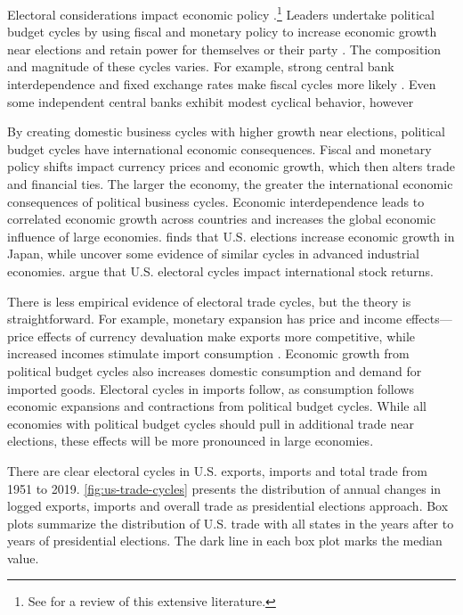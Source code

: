 \documentclass[12pt]{article}
\begin{document}
Electoral considerations impact economic policy \citep{Nordhaus1975}.\footnote{See \citet{Dubois2016} for a review of this extensive literature.} 
Leaders undertake political budget cycles by using fiscal and monetary policy to increase economic growth near elections and retain power for themselves or their party \citep{Tufte1978, Rogoff1987}. 
The composition and magnitude of these cycles varies. 
For example, strong central bank interdependence and fixed exchange rates make fiscal cycles more likely \citep{ClarkHallerberg2000}. 
Even some independent central banks exhibit modest cyclical behavior, however \citep[pg. 247]{Dubois2016}


By creating domestic business cycles with higher growth near elections, political budget cycles have international economic consequences.
Fiscal and monetary policy shifts impact currency prices and economic growth, which then alters trade and financial ties. 
The larger the economy, the greater the international economic consequences of political business cycles.
Economic interdependence leads to correlated economic growth across countries \citep{ArtisZhang1999, Kayser2006} and increases the global economic influence of large economies. 
\citet{Ito1991} finds that U.S. elections increase economic growth in Japan, while \citet{ThompsonZuk1983} uncover some evidence of similar cycles in advanced industrial economies.
\citet{FoersterSchmitz1997} argue that U.S. electoral cycles impact international stock returns.


There is less empirical evidence of electoral trade cycles, but the theory is straightforward.
For example, monetary expansion has price and income effects--- price effects of currency devaluation make exports more competitive, while increased incomes stimulate import consumption \citep{Sumner2021}.
Economic growth from political budget cycles also increases domestic consumption and demand for imported goods. 
Electoral cycles in imports follow, as consumption follows economic expansions and contractions from political budget cycles.  
While all economies with political budget cycles should pull in additional trade near elections, these effects will be more pronounced in large economies. 


There are clear electoral cycles in U.S. exports, imports and total trade from 1951 to 2019. 
\autoref{fig:us-trade-cycles} presents the distribution of annual changes in logged exports, imports and overall trade as presidential elections approach.
Box plots summarize the distribution of U.S. trade with all states in the years after to years of presidential elections. 
The dark line in each box plot marks the median value. 
\end{document}

